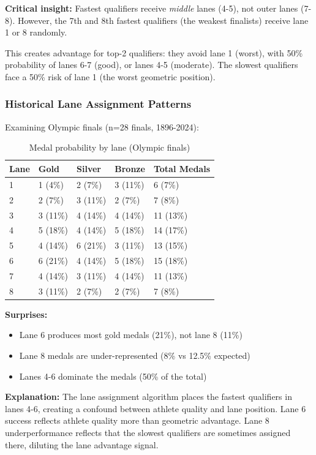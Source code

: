 \textbf{Critical insight:} Fastest qualifiers receive \textit{middle} lanes (4-5), not outer lanes (7-8). However, the 7th and 8th fastest qualifiers (the weakest finalists) receive lane 1 or 8 randomly.

This creates advantage for top-2 qualifiers: they avoid lane 1 (worst), with 50\% probability of lanes 6-7 (good), or lanes 4-5 (moderate). The slowest qualifiers face a 50\% risk of lane 1 (the worst geometric position).

\subsubsection{Historical Lane Assignment Patterns}

Examining Olympic finals (n=28 finals, 1896-2024):

\begin{table}[H]
\centering
\caption{Medal probability by lane (Olympic finals)}
\begin{tabular}{@{}lllll@{}}
\toprule
\textbf{Lane} & \textbf{Gold} & \textbf{Silver} & \textbf{Bronze} & \textbf{Total Medals} \\
\midrule
1 & 1 (4\%) & 2 (7\%) & 3 (11\%) & 6 (7\%) \\
2 & 2 (7\%) & 3 (11\%) & 2 (7\%) & 7 (8\%) \\
3 & 3 (11\%) & 4 (14\%) & 4 (14\%) & 11 (13\%) \\
4 & 5 (18\%) & 4 (14\%) & 5 (18\%) & 14 (17\%) \\
5 & 4 (14\%) & 6 (21\%) & 3 (11\%) & 13 (15\%) \\
6 & 6 (21\%) & 4 (14\%) & 5 (18\%) & 15 (18\%) \\
7 & 4 (14\%) & 3 (11\%) & 4 (14\%) & 11 (13\%) \\
8 & 3 (11\%) & 2 (7\%) & 2 (7\%) & 7 (8\%) \\
\bottomrule
\end{tabular}
\end{table}

\textbf{Surprises:}
\begin{itemize}
    \item Lane 6 produces most gold medals (21\%), not lane 8 (11\%)
    \item Lane 8 medals are under-represented (8\% vs 12.5\% expected)
    \item Lanes 4-6 dominate the medals (50\% of the total)
\end{itemize}

\textbf{Explanation:} The lane assignment algorithm places the fastest qualifiers in lanes 4-6, creating a confound between athlete quality and lane position. Lane 6 success reflects athlete quality more than geometric advantage. Lane 8 underperformance reflects that the slowest qualifiers are sometimes assigned there, diluting the lane advantage signal.

